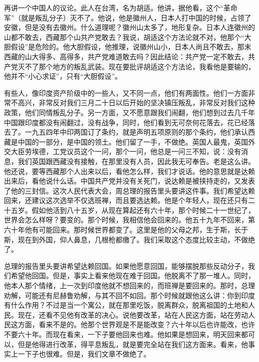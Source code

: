 再讲一个中国人的议论。此人在台湾，名为胡适。他讲，据他看，这个“革命军”（就是叛乱分子）灭不了。他说，他是徽州人，日本人打中国的时候，占领了安徽，但是没有去徽州。什么道理呢？徽州山太多了，地形复杂。日本人连徽州的山都不敢去，西藏那个山共产党敢去？我说，胡适这个方法论就不对，他那个“大胆假设”是危险的。他大胆假设，他推理，说徽州山小，日本人尚且不敢去，那末西藏的山大得多、高得多，共产党难道敢去吗？因此结论：共产党一定不敢去，共产党灭不了那个地方的叛乱武装。现在要批评胡适这个方法论，我看他是要输的，他并不“小心求证”，只有“大胆假设”。

有些人，像印度资产阶级中的一些人，又不同一点，他们有两面性。他们一方面非常不高兴，非常反对我们三月二十日以后开始的坚决镇压叛乱，非常反对我们这种政策，他们同情叛乱分子。另一方面，又不愿意跟我们闹翻，他们想到过去几千年中国跟印度都没有闹翻过，没有战争，同时，他们看到无可奈何花落去，花已经落去了。一九五四年中印两国订了条约，就是声明五项原则的那个条约，他们承认西藏是中国的一部分，是中国的领土。他们留了一手，不做绝。英国人最鬼，英国外交大臣劳埃德，工党议员这个一问，那个一问，他总是一问三不知，说：没有消息，我们英国跟西藏没有接触，在那里没有人员，因此我无可奉告。老是这么讲。他还说，要等西藏那个人出来以后，看他怎么样，我们才说话。他的意思就是达赖出来后，看他说什么话。中国共产党并没有关死门，说达赖是被挟持走的，又发表了他的三封信。这次人民代表大会，周总理的报告里头要讲这件事。我们希望达赖回来，还建议这次选举不仅选班禅，而且要选达赖。他是个年轻人，现在还只有二十五岁。假如他活到八十五岁，从现在算起还有六十年，那个时候二十一世纪了，世界会怎么样呀？要变的。那个时候，我相信他会回来的。他五十九年不回来，第六十年他有可能回来。那时候世界都变了。这里是他的父母之邦，生于斯，长于斯，现在到外国，仰人鼻息，几根枪都缴了。我们采取这个态度比较主动，不做绝了。

总理的报告里头要讲希望达赖回国。如果他愿意回国，能够摆脱那些反动分子，我们希望他回国。但是，事实上看来他现在难于回国。他脱离不了那一堆人。同时，他本人那个情绪，上一次到印度他就不想回来的，而班禅是要回来的。那时，总理劝解，可能还有尼赫鲁劝解，与其不回不如回。那个时候就跟他这么讲：你到印度有什么作用？不过是当一个寓公，就在那里吃饭，脱离群众，脱离祖国的土地和人民。现在，还看不见他有改革的决心。说他要改革，站在人民这方面，站在劳动人民这方面，看来不是的。他那个世界观是不是能改变？六十年以后也许能改，也许不要六十年。而现在看来，一下子要他回来也难。他如果是想回来，明天回来都可以，但是他得进行改革，得平息叛乱，就是要完全站在我们这方面来。看来，他事实上一下子也很难。但是，我们文章不做绝了。

